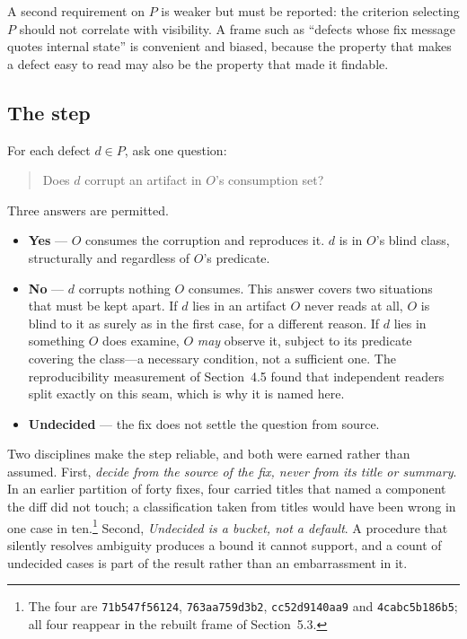 A second requirement on $P$ is weaker but must be reported: the criterion selecting
$P$ should not correlate with visibility. A frame such as ``defects whose fix
message quotes internal state'' is convenient and biased, because the property that
makes a defect easy to read may also be the property that made it findable.

\subsection{The step}

For each defect $d \in P$, ask one question:

\begin{quote}
Does $d$ corrupt an artifact in $O$'s consumption set?
\end{quote}

\noindent Three answers are permitted.

\begin{itemize}
\item \textbf{Yes} --- $O$ consumes the corruption and reproduces it. $d$ is in
      $O$'s blind class, structurally and regardless of $O$'s predicate.
\item \textbf{No} --- $d$ corrupts nothing $O$ consumes. This answer covers two
      situations that must be kept apart. If $d$ lies in an artifact $O$ never reads
      at all, $O$ is blind to it as surely as in the first case, for a different
      reason. If $d$ lies in something $O$ does examine, $O$ \emph{may} observe it,
      subject to its predicate covering the class---a necessary condition, not a
      sufficient one. The reproducibility measurement of Section~4.5 found that
      independent readers split exactly on this seam, which is why it is named here.
\item \textbf{Undecided} --- the fix does not settle the question from source.
\end{itemize}

Two disciplines make the step reliable, and both were earned rather than assumed.
First, \emph{decide from the source of the fix, never from its title or summary}.
In an earlier partition of forty fixes, four carried titles that named a
component the diff did not touch; a classification taken from titles would have been
wrong in one case in ten.\footnote{The four are \texttt{71b547f56124}, \texttt{763aa759d3b2},
\texttt{cc52d9140aa9} and \texttt{4cabc5b186b5}; all four reappear in the rebuilt frame of
Section~5.3.} Second, \emph{Undecided is a bucket, not a default}. A
procedure that silently resolves ambiguity produces a bound it cannot support, and
a count of undecided cases is part of the result rather than an embarrassment in it.

